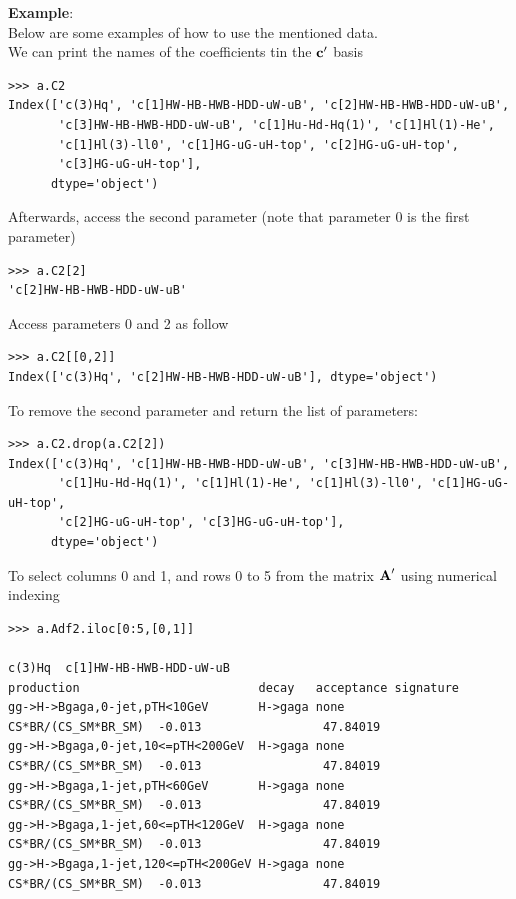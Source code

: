 \documentclass[12pt]{article}
\def\b#1{\boldsymbol{\rm #1}}
\begin{document}
\textbf{Example}:\\
Below are some examples of how to use the mentioned data. \\
We can print the names of the coefficients tin the $\b c'$ basis
\begin{verbatim}
>>> a.C2
Index(['c(3)Hq', 'c[1]HW-HB-HWB-HDD-uW-uB', 'c[2]HW-HB-HWB-HDD-uW-uB',
       'c[3]HW-HB-HWB-HDD-uW-uB', 'c[1]Hu-Hd-Hq(1)', 'c[1]Hl(1)-He',
       'c[1]Hl(3)-ll0', 'c[1]HG-uG-uH-top', 'c[2]HG-uG-uH-top',
       'c[3]HG-uG-uH-top'],
      dtype='object')
\end{verbatim}
Afterwards, access the second parameter (note that parameter 0 is the first parameter)
\begin{verbatim}
>>> a.C2[2]
'c[2]HW-HB-HWB-HDD-uW-uB'
\end{verbatim}
Access parameters 0 and 2 as follow
\begin{verbatim}
>>> a.C2[[0,2]]
Index(['c(3)Hq', 'c[2]HW-HB-HWB-HDD-uW-uB'], dtype='object')
\end{verbatim}
To remove the second parameter and return the list of parameters:
\begin{verbatim}
>>> a.C2.drop(a.C2[2])
Index(['c(3)Hq', 'c[1]HW-HB-HWB-HDD-uW-uB', 'c[3]HW-HB-HWB-HDD-uW-uB',
       'c[1]Hu-Hd-Hq(1)', 'c[1]Hl(1)-He', 'c[1]Hl(3)-ll0', 'c[1]HG-uG-uH-top',
       'c[2]HG-uG-uH-top', 'c[3]HG-uG-uH-top'],
      dtype='object')
\end{verbatim}
To select columns 0 and 1, and rows 0 to 5 from the matrix $\b A'$ using numerical indexing
\begin{verbatim}
>>> a.Adf2.iloc[0:5,[0,1]]
                                                                           c(3)Hq  c[1]HW-HB-HWB-HDD-uW-uB
production                         decay   acceptance signature                                           
gg->H->Bgaga,0-jet,pTH<10GeV       H->gaga none       CS*BR/(CS_SM*BR_SM)  -0.013                 47.84019
gg->H->Bgaga,0-jet,10<=pTH<200GeV  H->gaga none       CS*BR/(CS_SM*BR_SM)  -0.013                 47.84019
gg->H->Bgaga,1-jet,pTH<60GeV       H->gaga none       CS*BR/(CS_SM*BR_SM)  -0.013                 47.84019
gg->H->Bgaga,1-jet,60<=pTH<120GeV  H->gaga none       CS*BR/(CS_SM*BR_SM)  -0.013                 47.84019
gg->H->Bgaga,1-jet,120<=pTH<200GeV H->gaga none       CS*BR/(CS_SM*BR_SM)  -0.013                 47.84019
\end{verbatim}
\end{document}
